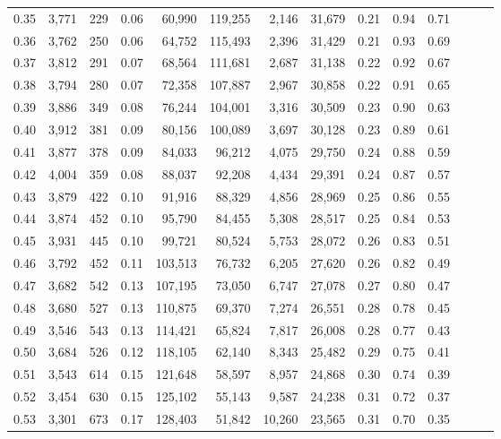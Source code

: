 \begin{tabular}{rrrrrrrrrrrrrr}
0.35 &  3,771 &  229 &  0.06 &   60,990 &  119,255 &   2,146 &  31,679 &  0.21 &  0.94 &      0.71 \\
0.36 &  3,762 &  250 &  0.06 &   64,752 &  115,493 &   2,396 &  31,429 &  0.21 &  0.93 &      0.69 \\
0.37 &  3,812 &  291 &  0.07 &   68,564 &  111,681 &   2,687 &  31,138 &  0.22 &  0.92 &      0.67 \\
0.38 &  3,794 &  280 &  0.07 &   72,358 &  107,887 &   2,967 &  30,858 &  0.22 &  0.91 &      0.65 \\
0.39 &  3,886 &  349 &  0.08 &   76,244 &  104,001 &   3,316 &  30,509 &  0.23 &  0.90 &      0.63 \\
0.40 &  3,912 &  381 &  0.09 &   80,156 &  100,089 &   3,697 &  30,128 &  0.23 &  0.89 &      0.61 \\
0.41 &  3,877 &  378 &  0.09 &   84,033 &   96,212 &   4,075 &  29,750 &  0.24 &  0.88 &      0.59 \\
0.42 &  4,004 &  359 &  0.08 &   88,037 &   92,208 &   4,434 &  29,391 &  0.24 &  0.87 &      0.57 \\
0.43 &  3,879 &  422 &  0.10 &   91,916 &   88,329 &   4,856 &  28,969 &  0.25 &  0.86 &      0.55 \\
0.44 &  3,874 &  452 &  0.10 &   95,790 &   84,455 &   5,308 &  28,517 &  0.25 &  0.84 &      0.53 \\
0.45 &  3,931 &  445 &  0.10 &   99,721 &   80,524 &   5,753 &  28,072 &  0.26 &  0.83 &      0.51 \\
0.46 &  3,792 &  452 &  0.11 &  103,513 &   76,732 &   6,205 &  27,620 &  0.26 &  0.82 &      0.49 \\
0.47 &  3,682 &  542 &  0.13 &  107,195 &   73,050 &   6,747 &  27,078 &  0.27 &  0.80 &      0.47 \\
0.48 &  3,680 &  527 &  0.13 &  110,875 &   69,370 &   7,274 &  26,551 &  0.28 &  0.78 &      0.45 \\
0.49 &  3,546 &  543 &  0.13 &  114,421 &   65,824 &   7,817 &  26,008 &  0.28 &  0.77 &      0.43 \\
0.50 &  3,684 &  526 &  0.12 &  118,105 &   62,140 &   8,343 &  25,482 &  0.29 &  0.75 &      0.41 \\
0.51 &  3,543 &  614 &  0.15 &  121,648 &   58,597 &   8,957 &  24,868 &  0.30 &  0.74 &      0.39 \\
0.52 &  3,454 &  630 &  0.15 &  125,102 &   55,143 &   9,587 &  24,238 &  0.31 &  0.72 &      0.37 \\
0.53 &  3,301 &  673 &  0.17 &  128,403 &   51,842 &  10,260 &  23,565 &  0.31 &  0.70 &      0.35 \\

\end{tabular}

